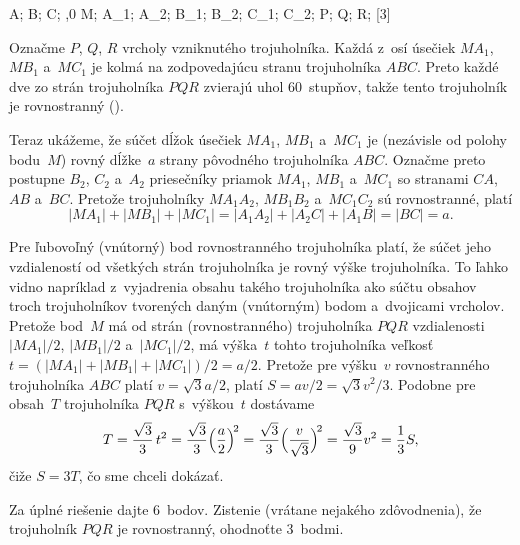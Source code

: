 {%
\fontplace
\tpoint A; \tpoint B; \bpoint C;
\lbpoint{},0 M;
\lBpoint A_1; \lBpoint A_2;
\rBpoint B_1; \rbpoint B_2;
\tpoint C_1; \tpoint C_2;
\rpoint P; \tpoint Q; \bpoint R;
[3] \hfil\Obr

Označme $P$, $Q$, $R$ vrcholy vzniknutého trojuholníka. Každá z~osí
úsečiek $MA_1$, $MB_1$ a~$MC_1$ je kolmá na zodpovedajúcu stranu
trojuholníka $ABC$. Preto každé dve zo strán trojuholníka $PQR$ zvierajú uhol
60~stupňov, takže tento trojuholník je rovnostranný (\obr).

\inspicture{}

Teraz ukážeme, že súčet dĺžok úsečiek $MA_1$, $MB_1$ a~$MC_1$ je
(nezávisle od polohy bodu~$M$) rovný dĺžke~$a$ strany pôvodného
trojuholníka $ABC$. Označme preto postupne $B_2$, $C_2$ a~$A_2$ priesečníky
priamok $MA_1$, $MB_1$ a~$MC_1$ so stranami $CA$, $AB$ a~$BC$.
Pretože trojuholníky $MA_1A_2$, $MB_1B_2$ a~$MC_1C_2$ sú rovnostranné,
platí
$$
|MA_1|+|MB_1|+|MC_1|=|A_1A_2|+|A_2C|+|A_1B|=|BC|=a.
$$

Pre ľubovoľný (vnútorný) bod rovnostranného trojuholníka
platí, že súčet jeho vzdialeností od všetkých strán trojuholníka je rovný
výške trojuholníka. To ľahko vidno napríklad z~vyjadrenia
obsahu takého trojuholníka ako súčtu obsahov troch trojuholníkov tvorených
daným (vnútorným) bodom a~dvojicami vrcholov.
Pretože bod~$M$ má od strán (rovnostranného) trojuholníka $PQR$
vzdialenosti $|MA_1|/2$, $|MB_1|/2$ a~$|MC_1|/2$,
má výška~$t$ tohto
trojuholníka veľkosť $t=(|MA_1|+|MB_1|+|MC_1|)/2=a/2$.
Pretože pre výšku~$v$ rovnostranného trojuholníka $ABC$ platí
$v=\sqrt3a/2$, platí $S=av/2=\sqrt3v^2/3$.
Podobne pre obsah~$T$ trojuholníka $PQR$ s~výškou~$t$ dostávame
$$
T=\frac{\sqrt3}3\,t^2=\frac{\sqrt3}3\Bigl(\frac a2\Bigr)^{\!2}
=\frac{\sqrt3}3\Bigl(\frac v{\sqrt3}\Bigr)^{\!2}=
  \frac{\sqrt3}9v^2=\frac13S,
$$
čiže $S=3T$, čo sme chceli dokázať.

\nobreak\medskip\petit\noindent
Za úplné riešenie dajte 6~bodov.
Zistenie (vrátane nejakého zdôvodnenia), že trojuholník $PQR$
je rovnostranný, ohodnoťte 3~bodmi.
\endpetit
\bigbreak}

